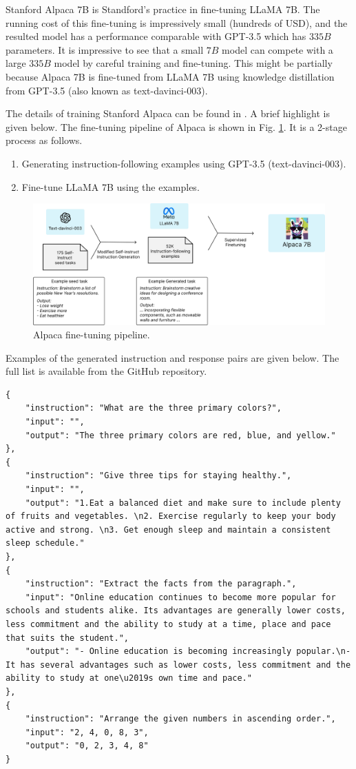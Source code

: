 Stanford Alpaca 7B is Standford's practice in fine-tuning LLaMA 7B. The running cost of this fine-tuning is impressively small (hundreds of USD), and the resulted model has a performance comparable with GPT-3.5 which has $335B$ parameters. It is impressive to see that a small $7B$ model can compete with a large $335B$ model by careful training and fine-tuning. This might be partially because Alpaca 7B is fine-tuned from LLaMA 7B using knowledge distillation from GPT-3.5 (also known as text-davinci-003).

The details of training Stanford Alpaca can be found in \cite{alpaca}. A brief highlight is given below. The fine-tuning pipeline of Alpaca is shown in Fig. \ref{fig:alpaca_pipeline}. It is a 2-stage process as follows.
\begin{enumerate}
	\item Generating instruction-following examples using GPT-3.5 (text-davinci-003).
	\item Fine-tune LLaMA 7B using the examples.
\end{enumerate}
\begin{figure}[!htb]
	\centering
	\includegraphics[width=\textwidth]{./chapters/part-7/figures/alpaca_pipeline.jpg}
	\caption{Alpaca fine-tuning pipeline.}
	\label{fig:alpaca_pipeline}
\end{figure}

Examples of the generated instruction and response pairs are given below. The full list is available from the GitHub repository.
\begin{lstlisting}
{
	"instruction": "What are the three primary colors?",
	"input": "",
	"output": "The three primary colors are red, blue, and yellow."
},
{
	"instruction": "Give three tips for staying healthy.",
	"input": "",
	"output": "1.Eat a balanced diet and make sure to include plenty of fruits and vegetables. \n2. Exercise regularly to keep your body active and strong. \n3. Get enough sleep and maintain a consistent sleep schedule."
},
{
	"instruction": "Extract the facts from the paragraph.",
	"input": "Online education continues to become more popular for schools and students alike. Its advantages are generally lower costs, less commitment and the ability to study at a time, place and pace that suits the student.",
	"output": "- Online education is becoming increasingly popular.\n- It has several advantages such as lower costs, less commitment and the ability to study at one\u2019s own time and pace."
},
{
	"instruction": "Arrange the given numbers in ascending order.",
	"input": "2, 4, 0, 8, 3",
	"output": "0, 2, 3, 4, 8"
}
\end{lstlisting}

